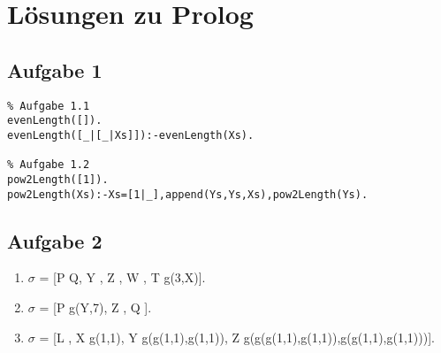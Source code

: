 \documentclass{scrartcl}
\newcommand{\rep}{\pointer}
\begin{document}
\lstset{language=Prolog}
\section*{Lösungen zu Prolog}
\subsection*{Aufgabe 1}
\begin{lstlisting}
% Aufgabe 1.1
evenLength([]).
evenLength([_|[_|Xs]]):-evenLength(Xs).

% Aufgabe 1.2
pow2Length([1]).
pow2Length(Xs):-Xs=[1|_],append(Ys,Ys,Xs),pow2Length(Ys).
\end{lstlisting}

\subsection*{Aufgabe 2}
\begin{enumerate}[1.]
\item $\sigma$ = [P \rep Q, Y \rep 1, Z \rep 7, W \rep [4], T \rep g(3,X)].
\item $\sigma$ = [P \rep g(Y,7), Z \rep [3,g(Y,7)], Q \rep 4].
\item $\sigma$ = [L \rep 1, X \rep g(1,1), Y \rep g(g(1,1),g(1,1)), Z \rep g(g(g(1,1),g(1,1)),g(g(1,1),g(1,1)))].
\end{enumerate}
\end{document}
